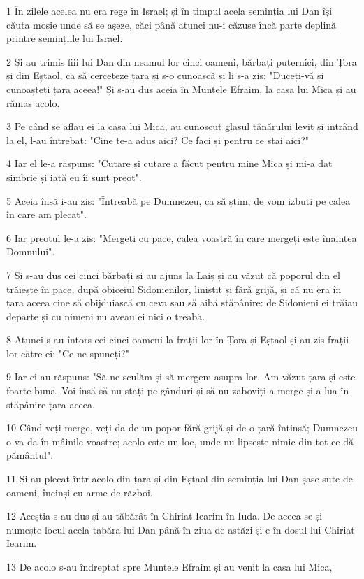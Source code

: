 \par 1 În zilele acelea nu era rege în Israel; și în timpul acela seminția lui Dan își căuta moșie unde să se așeze, căci până atunci nu-i căzuse încă parte deplină printre semințiile lui Israel.
\par 2 Și au trimis fiii lui Dan din neamul lor cinci oameni, bărbați puternici, din Țora și din Eștaol, ca să cerceteze țara și s-o cunoască și li s-a zis: "Duceți-vă și cunoașteți țara aceea!" Și s-au dus aceia în Muntele Efraim, la casa lui Mica și au rămas acolo.
\par 3 Pe când se aflau ei la casa lui Mica, au cunoscut glasul tânărului levit și intrând la el, l-au întrebat: "Cine te-a adus aici? Ce faci și pentru ce stai aici?"
\par 4 Iar el le-a răspuns: "Cutare și cutare a făcut pentru mine Mica și mi-a dat simbrie și iată eu îi sunt preot".
\par 5 Aceia însă i-au zis: "Întreabă pe Dumnezeu, ca să știm, de vom izbuti pe calea în care am plecat".
\par 6 Iar preotul le-a zis: "Mergeți cu pace, calea voastră în care mergeți este înaintea Domnului".
\par 7 Și s-au dus cei cinci bărbați și au ajuns la Laiș și au văzut că poporul din el trăiește în pace, după obiceiul Sidonienilor, liniștit și fără grijă, și că nu era în țara aceea cine să obijduiască cu ceva sau să aibă stăpânire: de Sidonieni ei trăiau departe și cu nimeni nu aveau ei nici o treabă.
\par 8 Atunci s-au întors cei cinci oameni la frații lor în Țora și Eștaol și au zis frații lor către ei: "Ce ne spuneți?"
\par 9 Iar ei au răspuns: "Să ne sculăm și să mergem asupra lor. Am văzut țara și este foarte bună. Voi însă să nu stați pe gânduri și să nu zăboviți a merge și a lua în stăpânire țara aceea.
\par 10 Când veți merge, veți da de un popor fără grijă și de o țară întinsă; Dumnezeu o va da în mâinile voastre; acolo este un loc, unde nu lipsește nimic din tot ce dă pământul".
\par 11 Și au plecat într-acolo din țara și din Eștaol din seminția lui Dan șase sute de oameni, încinși cu arme de război.
\par 12 Aceștia s-au dus și au tăbărât în Chiriat-Iearim în Iuda. De aceea se și numește locul acela tabăra lui Dan până în ziua de astăzi și e în dosul lui Chiriat-Iearim.
\par 13 De acolo s-au îndreptat spre Muntele Efraim și au venit la casa lui Mica,
